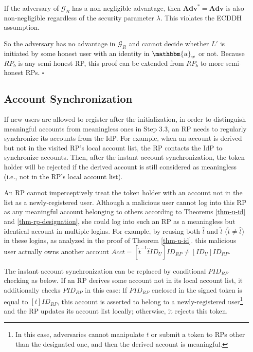 If the adversary of $\mathcal{G}_R$ has a non-negligible advantage, then $\mathbf{Adv}^*={\mathbf{Adv}}$ is also non-negligible regardless of the security parameter $\lambda$. This violates the ECDDH assumption.

So the adversary has no advantage in $\mathcal{G}_R$ and cannot decide whether $L'$ is initiated by some honest user with an identity in $\mathbbm{u}_w$ or not.
Because $RP_b$ is any semi-honest RP, this proof can be extended from $RP_b$ to more semi-honest RPs.
\hfill $\square$


\subsection{Account Synchronization}
\label{account-syn}
If new users are allowed to register after the initialization,
in order to distinguish meaningful accounts from meaningless ones in Step 3.3,
 an RP needs to regularly synchronize its accounts from the IdP.
For example,
    when an account is derived but not in the visited RP's local account list,
        the RP contacts the IdP to synchronize accounts.
Then, after the instant account synchronization, 
    the token holder will be rejected
     if the derived account is still considered as meaningless (i.e., not in the RP's local account list).

An RP cannot imperceptively treat the token holder with an account not in the list
 as a newly-registered user.
Although a malicious user cannot log into this RP as any meaningful account belonging to others according to Theorems \ref{thm-u-id} and \ref{thm-rp-designation},
 she could log into such an RP as a meaningless but identical account in multiple logins.
For example,
    by reusing both $\hat{t}$ and $\check{t}$ ($\check{t} \neq \hat{t}$) in these logins,
    as analyzed in the proof of Theorem \ref{thm-u-id}.
this malicious user actually owns another account $Acct=[\check{t}^{-1}\hat{t}ID_U]ID_{RP} \neq [ID_U]ID_{RP}$.


The instant account synchronization can be replaced by conditional $PID_{RP}$ checking as below.
If an RP derives some account not in its local account list,
    it additionally checks $PID_{RP}$ in this case:
     If $PID_{RP}$ enclosed in the signed token is equal to $[t]ID_{RP}$,
                this account is asserted to belong to a newly-registered user\footnote{In this case, adversaries cannot manipulate $t$ or submit a token to RPs other than the designated one,
                and then the derived account is meaningful.}
                and the RP updates its account list locally;
    otherwise, it rejects this token.



